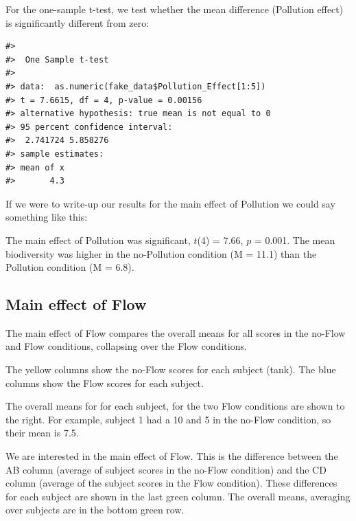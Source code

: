 \documentclass[
  letterpaper,
  DIV=11,
  numbers=noendperiod]{scrreprt}
\begin{document}
For the one-sample t-test, we test whether the mean difference
(Pollution effect) is significantly different from zero:

\begin{verbatim}
#> 
#>  One Sample t-test
#> 
#> data:  as.numeric(fake_data$Pollution_Effect[1:5])
#> t = 7.6615, df = 4, p-value = 0.00156
#> alternative hypothesis: true mean is not equal to 0
#> 95 percent confidence interval:
#>  2.741724 5.858276
#> sample estimates:
#> mean of x 
#>       4.3
\end{verbatim}

If we were to write-up our results for the main effect of Pollution we
could say something like this:

The main effect of Pollution was significant, \(t\)(4) = 7.66, \(p\) =
0.001. The mean biodiversity was higher in the no-Pollution condition (M
= 11.1) than the Pollution condition (M = 6.8).

\subsection{Main effect of Flow}\label{main-effect-of-flow}

The main effect of Flow compares the overall means for all scores in the
no-Flow and Flow conditions, collapsing over the Flow conditions.

The yellow columns show the no-Flow scores for each subject (tank). The
blue columns show the Flow scores for each subject.

The overall means for for each subject, for the two Flow conditions are
shown to the right. For example, subject 1 had a 10 and 5 in the no-Flow
condition, so their mean is 7.5.

We are interested in the main effect of Flow. This is the difference
between the AB column (average of subject scores in the no-Flow
condition) and the CD column (average of the subject scores in the Flow
condition). These differences for each subject are shown in the last
green column. The overall means, averaging over subjects are in the
bottom green row.
\end{document}
